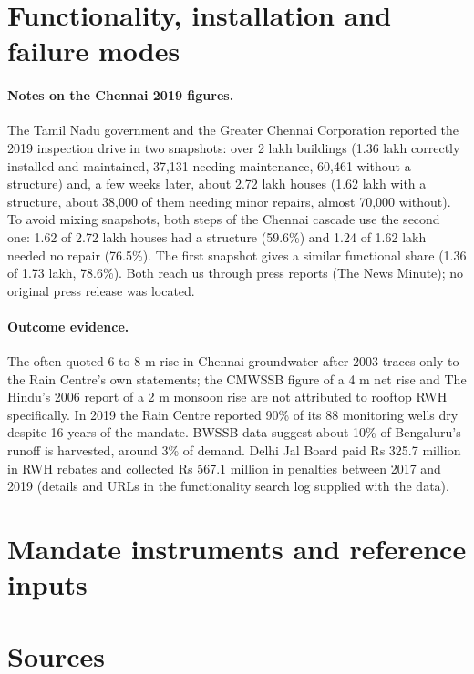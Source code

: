 \section{Functionality, installation and failure modes}

\paragraph{Notes on the Chennai 2019 figures.} The Tamil Nadu government and the Greater Chennai Corporation reported the 2019 inspection drive in two snapshots: over 2 lakh buildings (1.36 lakh correctly installed and maintained, 37,131 needing maintenance, 60,461 without a structure) and, a few weeks later, about 2.72 lakh houses (1.62 lakh with a structure, about 38,000 of them needing minor repairs, almost 70,000 without). To avoid mixing snapshots, both steps of the Chennai cascade use the second one: 1.62 of 2.72 lakh houses had a structure (59.6\%) and 1.24 of 1.62 lakh needed no repair (76.5\%). The first snapshot gives a similar functional share (1.36 of 1.73 lakh, 78.6\%). Both reach us through press reports (The News Minute); no original press release was located.


\paragraph{Outcome evidence.} The often-quoted 6 to 8 m rise in Chennai groundwater after 2003 traces only to the Rain Centre's own statements; the CMWSSB figure of a 4 m net rise and The Hindu's 2006 report of a 2 m monsoon rise are not attributed to rooftop RWH specifically. In 2019 the Rain Centre reported 90\% of its 88 monitoring wells dry despite 16 years of the mandate. BWSSB data suggest about 10\% of Bengaluru's runoff is harvested, around 3\% of demand. Delhi Jal Board paid Rs 325.7 million in RWH rebates and collected Rs 567.1 million in penalties between 2017 and 2019 (details and URLs in the functionality search log supplied with the data).

\section{Mandate instruments and reference inputs}



\section{Sources}


